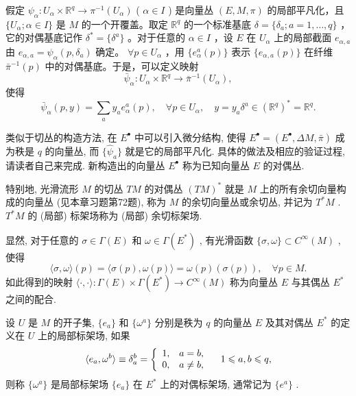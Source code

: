 假定  $\psi_{\alpha}: U_{\alpha} \times \mathbb{R}^{q} \to \pi^{-1}(U_{\alpha})$  ( $\alpha \in I$ ) 是向量丛  $(E, M, \pi)$  的局部平凡化，且  $\{U_{\alpha}; \alpha \in I\}$  是  $M$  的一个开覆盖。取定  $\mathbb{R}^{q}$  的一个标准基底  $\delta = \{\delta_{a}; a = 1, \dots, q\}$ ，它的对偶基底记作  $\delta^{*} = \{\delta^{a}\}$ 。对于任意的  $\alpha \in I$ ，设  $E$  在  $U_{\alpha}$  上的局部截面  $e_{\alpha, a}$  由  $e_{\alpha, a} = \psi_{\alpha}(p, \delta_{a})$  确定。 $\forall p \in U_{\alpha}$ ，用  $\{e_{\alpha}^{a}(p)\}$  表示  $\{e_{\alpha, a}(p)\}$  在纤维  $\bar{\pi}^{-1}(p)$  中的对偶基底。于是，可以定义映射
$$
\bar {\psi} _ {\alpha}: U _ {\alpha} \times \mathbb {R} ^ {q} \rightarrow \bar {\pi} ^ {- 1} (U _ {\alpha}),
$$
使得
$$
\bar {\psi} _ {\alpha} (p, y) = \sum_ {a} y _ {a} e _ {\alpha} ^ {a} (p), \quad \forall p \in U _ {\alpha}, \quad y = y _ {a} \delta^ {a} \in (\mathbb {R} ^ {q}) ^ {*} = \mathbb {R} ^ {q}.
$$

类似于切丛的构造方法, 在  $E^{\bullet}$  中可以引入微分结构, 使得  $E^{\bullet} = (E^{\bullet}, \Delta M, \bar{\pi})$  成为秩是  $q$  的向量丛, 而  $\{\hat{\psi}_a\}$  就是它的局部平凡化. 具体的做法及相应的验证过程, 请读者自己来完成. 新构造出的向量丛  $E^{\bullet}$  称为已知向量丛  $E$  的对偶丛.

特别地, 光滑流形  $M$  的切丛  $TM$  的对偶丛  $(TM)^{*}$  就是  $M$  上的所有余切向量构成的向量丛 (见本章习题第72题), 称为  $M$  的余切向量丛或余切丛, 并记为  $T^{*}M$ .  $T^{*}M$  的 (局部) 标架场称为 (局部) 余切标架场.

显然, 对于任意的  $\sigma \in \Gamma(E)$  和  $\omega \in \Gamma(E^{*})$ , 有光滑函数  $\{\sigma, \omega\} \subset C^{\infty}(M)$ , 使得
$$
\langle \sigma , \omega \rangle (p) = \langle \sigma (p), \omega (p) \rangle = \omega (p) (\sigma (p)), \quad \forall p \in M.
$$
如此得到的映射  $\langle \cdot, \cdot \rangle : \Gamma(E) \times \Gamma(E^{*}) \to C^{\infty}(M)$  称为向量丛  $E$  与其偶丛  $E^{*}$  之间的配合.

设  $U$  是  $M$  的开子集,  $\{e_a\}$  和  $\{\omega^a\}$  分别是秩为  $q$  的向量丛  $E$  及其对偶丛  $E^*$  的定义在  $U$  上的局部标架场, 如果
$$
\langle e _ {a}, \omega^ {b} \rangle \equiv \delta_ {a} ^ {b} = \left\{ \begin{array}{l l} 1, & a = b, \\ 0, & a \neq b, \end{array} \right. \quad 1 \leqslant a, b \leqslant q,
$$
则称  $\{\omega^a\}$  是局部标架场  $\{e_a\}$  在  $E^{*}$  上的对偶标架场, 通常记为  $\{e^a\}$ .

